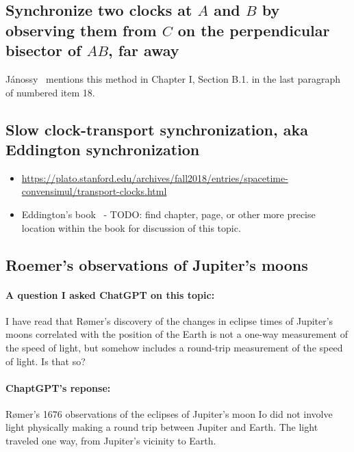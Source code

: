 \documentclass[a4paper]{article}
\theoremstyle{plain}
\theoremstyle{definition}
\begin{document}
\subsection{Synchronize two clocks at $A$ and $B$ by observing them from $C$ on the perpendicular bisector of $AB$, far away}

J{\'a}nossy~\cite{Janossy1971} mentions this method in Chapter I,
Section B.1. in the last paragraph of numbered item 18.


\subsection{Slow clock-transport synchronization, aka Eddington synchronization}

\begin{itemize}

\item
  \url{https://plato.stanford.edu/archives/fall2018/entries/spacetime-convensimul/transport-clocks.html}~\cite{fall2018-transport-of-clocks}

\item Eddington's book~\cite{Eddington1923} - TODO: find chapter,
  page, or other more precise location within the book for discussion
  of this topic.

\end{itemize}


\subsection{Roemer's observations of Jupiter's moons}

\paragraph{A question I asked ChatGPT on this topic:}

I have read that R\o{}mer's discovery of the changes in eclipse times
of Jupiter's moons correlated with the position of the Earth is not a
one-way measurement of the speed of light, but somehow includes a
round-trip measurement of the speed of light.  Is that so?

\paragraph{ChaptGPT's reponse:}

R\o{}mer's 1676 observations of the eclipses of Jupiter's moon Io did
not involve light physically making a round trip between Jupiter and
Earth. The light traveled one way, from Jupiter's vicinity to Earth.
\end{document}

